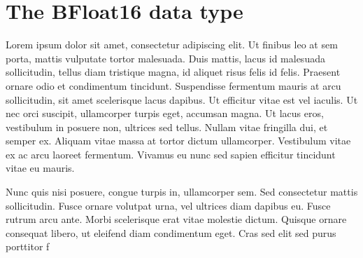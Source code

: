 \section{The BFloat16 data type}
Lorem ipsum dolor sit amet, consectetur adipiscing elit. Ut finibus leo at sem porta, mattis vulputate tortor malesuada. Duis mattis, lacus id malesuada sollicitudin, tellus diam tristique magna, id aliquet risus felis id felis. Praesent ornare odio et condimentum tincidunt. Suspendisse fermentum mauris at arcu sollicitudin, sit amet scelerisque lacus dapibus. Ut efficitur vitae est vel iaculis. Ut nec orci suscipit, ullamcorper turpis eget, accumsan magna. Ut lacus eros, vestibulum in posuere non, ultrices sed tellus. Nullam vitae fringilla dui, et semper ex. Aliquam vitae massa at tortor dictum ullamcorper. Vestibulum vitae ex ac arcu laoreet fermentum. Vivamus eu nunc sed sapien efficitur tincidunt vitae eu mauris.

Nunc quis nisi posuere, congue turpis in, ullamcorper sem. Sed consectetur mattis sollicitudin. Fusce ornare volutpat urna, vel ultrices diam dapibus eu. Fusce rutrum arcu ante. Morbi scelerisque erat vitae molestie dictum. Quisque ornare consequat libero, ut eleifend diam condimentum eget. Cras sed elit sed purus porttitor f